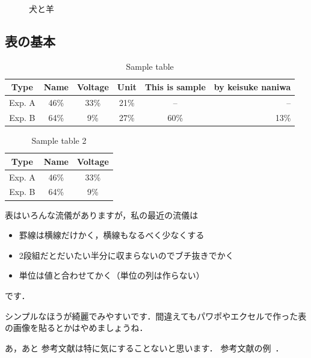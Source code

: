 \documentclass[a4j]{jsarticle}
\numberwithin{equation}{section}%
\begin{document}
\begin{figure}[tb]
\begin{minipage}[b]{.5\columnwidth}
  \label{fig:gorilla}
 \end{minipage}
 \caption{犬と羊}\label{fig:animals}
\end{figure}

\subsection{表の基本}

\begin{table}[tb]
  \caption{Sample table}
   \label{table:test}
   \centering
   \begin{tabular}{cccccr}\hline
    Type & Name & Voltage & Unit & This is sample & by keisuke naniwa\\ \hline \hline
   Exp. A & 46\%& 33\%& 21\%& --& --\\ 
   Exp. B & 64\%& 9\%& 27\%& 60\%& 13\%\\ \hline    
   \end{tabular}
\end{table}
\fi%

\begin{table}[tb]
  \caption{Sample table 2}
   \label{table:test2}
   \centering
   \begin{tabular}{ccc}\hline
    Type & Name & Voltage \\ \hline \hline
   Exp. A & 46\%& 33\% \\ 
   Exp. B & 64\%& 9\% \\ \hline    
   \end{tabular}
\end{table}

表はいろんな流儀がありますが，私の最近の流儀は
\begin{itemize}
 \item 罫線は横線だけかく，横線もなるべく少なくする
 \item 2段組だとだいたい半分に収まらないのでブチ抜きでかく
 \item 単位は値と合わせてかく（単位の列は作らない）
\end{itemize}
です．

シンプルなほうが綺麗でみやすいです．間違えてもパワポやエクセルで作った表の画像を貼るとかはやめましょうね．

あ，あと
参考文献は特に気にすることないと思います．
参考文献の例~\cite{mike,bibtest}．
\end{document}
